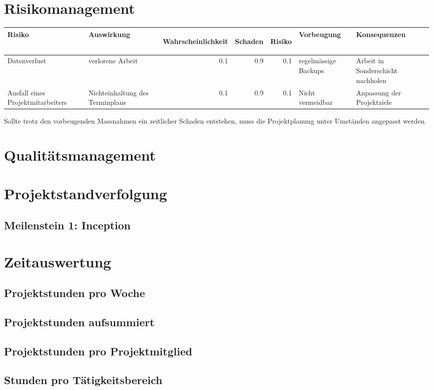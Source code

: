 \label{tab:MeilensteineZiele}

\newpage
\section{Risikomanagement}

\begin{tabular}[t]{|p{3cm}|p{3cm}|r|r|r|p{3cm}|p{3cm}|}\hline
\textbf{Risiko} &
  \textbf{Auswirkung} &
  \begin{sideways} \textbf{Wahrscheinlichkeit } \end{sideways} &
  \begin{sideways}\textbf{Schaden} \end{sideways} &
  \begin{sideways}\textbf{Risiko} \end{sideways} &
  \textbf{Vorbeugung} & \textbf{Konsequenzen} \\ \hline \hline
Datenverlust &
  verlorene Arbeit &
  0.1 & 0.9 & 0.1 &
  regelmässige Backups &
  Arbeit in Sonderschicht nachholen \\ \hline
Ausfall eines Projektmitarbeiters &
  Nichteinhaltung des Terminplans &
  0.1 & 0.9 & 0.1 &
  Nicht vermeidbar &
  Anpassung der Projektziele \\ \hline
\end{tabular}
\label{tab:Risiken}

Sollte trotz den vorbeugenden Massnahmen ein zeitlicher Schaden entstehen, muss
die Projektplanung unter Umständen angepasst werden.

\section{Qualitätsmanagement}

\section{Projektstandverfolgung}

\subsection{Meilenstein 1: Inception}

\section{Zeitauswertung}

\subsection{Projektstunden pro Woche}

\subsection{Projektstunden aufsummiert}

\subsection{Projektstunden pro Projektmitglied}

\subsection{Stunden pro Tätigkeitsbereich}
